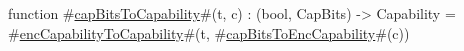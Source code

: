 function #\hyperref[sailRISCVzcapBitsToCapability]{capBitsToCapability}#(t, c) : (bool, CapBits) -> Capability = #\hyperref[sailRISCVzencCapabilityToCapability]{encCapabilityToCapability}#(t, #\hyperref[sailRISCVzcapBitsToEncCapability]{capBitsToEncCapability}#(c))
